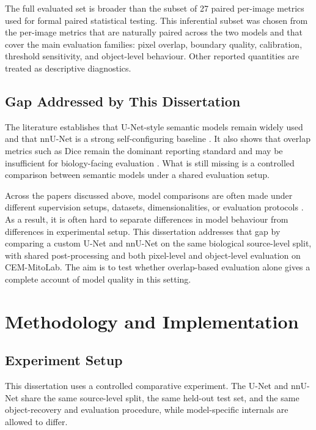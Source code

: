 \documentclass[logo,bsc,singlespacing,parskip,online]{infthesis}
\begin{document}
The full evaluated set is broader than the subset of 27 paired per-image
metrics used for formal paired statistical testing. This inferential subset was
chosen from the per-image metrics that are naturally paired across the two
models and that cover the main evaluation families: pixel overlap, boundary
quality, calibration, threshold sensitivity, and object-level behaviour. Other
reported quantities are treated as descriptive diagnostics.

\section{Gap Addressed by This Dissertation}

The literature establishes that U-Net-style semantic models remain widely used
and that nnU-Net is a strong self-configuring baseline
\citep{ronneberger2015unet, isensee2021nnu}. It also shows that overlap metrics
such as Dice remain the dominant reporting standard and may be insufficient for
biology-facing evaluation \citep{franco-barranco2022stable, wei2020mitoem,
conrad2023instance}. What is still missing is a controlled comparison between
semantic models under a shared evaluation setup.

Across the papers discussed above, model comparisons are often made under
different supervision setups, datasets, dimensionalities, or evaluation
protocols \citep{wei2020mitoem, conrad2023instance, xie2025transfer,
chen2025gctransnet}. As a result, it is often hard to separate differences in
model behaviour from differences in experimental setup.
This dissertation addresses that gap by comparing a custom U-Net and nnU-Net on
the same biological source-level split, with shared post-processing and both
pixel-level and object-level evaluation on CEM-MitoLab. The aim is 
to test whether overlap-based evaluation
alone gives a complete account of model quality in this setting.







\chapter{Methodology and Implementation}

\section{Experiment Setup}

This dissertation uses a controlled comparative experiment. The U-Net and nnU-Net
share the same source-level split, the same held-out test set, and the same
object-recovery and evaluation procedure, while model-specific internals are
allowed to differ.
\end{document}
